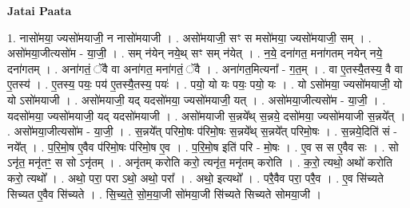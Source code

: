 \documentclass[17pt]{extarticle}
\begin{document}
\textbf{Jatai Paata} \newline

1. नासो॑मया॒ ज्यसो॑मयाजी॒ न नासो॑मयाजी । . असो॑मयाजी॒ सꣳ स मसो॑मया॒ ज्यसो॑मयाजी॒ सम् । . असो॑मया॒जीत्यसो॑म - या॒जी॒ । . सम् न॑येन् नये॒थ् सꣳ सम् न॑येत् । . न॒ये॒ दना॑गत॒ मना॑गतम् नयेन् नये॒ दना॑गतम् । . अना॑गतं॒ ॅवै वा अना॑गत॒ मना॑गतं॒ ॅवै । . अना॑गत॒मित्यना᳚ - ग॒त॒म् । . वा ए॒तस्यै॒तस्य॒ वै वा ए॒तस्य॑ । . ए॒तस्य॒ पयः॒ पय॑ ए॒तस्यै॒तस्य॒ पयः॑ । . पयो॒ यो यः पयः॒ पयो॒ यः । . यो ऽसो॑मया॒ ज्यसो॑मयाजी॒ यो यो ऽसो॑मयाजी । . असो॑मयाजी॒ यद् यदसो॑मया॒ ज्यसो॑मयाजी॒ यत् । . असो॑मया॒जीत्यसो॑म - या॒जी॒ । . यदसो॑मया॒ ज्यसो॑मयाजी॒ यद् यदसो॑मयाजी । . असो॑मयाजी स॒न्नये᳚थ् स॒न्नये॒ दसो॑मया॒ ज्यसो॑मयाजी स॒न्नये᳚त् । . असो॑मया॒जीत्यसो॑म - या॒जी॒ । . स॒न्नये᳚त् परिमो॒षः प॑रिमो॒षः स॒न्नये᳚थ् स॒न्नये᳚त् परिमो॒षः । . स॒न्नये॒दिति॑ सं - नये᳚त् । . प॒रि॒मो॒ष ए॒वैव प॑रिमो॒षः प॑रिमो॒ष ए॒व । . प॒रि॒मो॒ष इति॑ परि - मो॒षः । . ए॒व स स ए॒वैव सः । . सो ऽनृ॑त॒ मनृ॑तꣳ॒॒ स सो ऽनृ॑तम् । . अनृ॑तम् करोति करो॒ त्यनृ॑त॒ मनृ॑तम् करोति । . क॒रो॒ त्यथो॒ अथो॑ करोति करो॒ त्यथो᳚ । . अथो॒ परा॒ परा ऽथो॒ अथो॒ परा᳚ । . अथो॒ इत्यथो᳚ । . परै॒वैव परा॒ परै॒व । . ए॒व सि॑च्यते सिच्यत ए॒वैव सि॑च्यते । . सि॒च्य॒ते॒ सो॒म॒या॒जी सो॑मया॒जी सि॑च्यते सिच्यते सोमया॒जी । \newline
\end{document}
